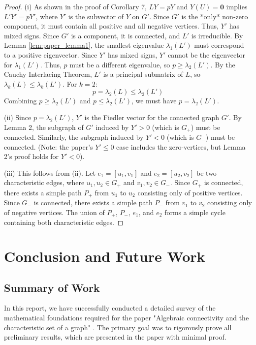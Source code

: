\documentclass[12pt,a4paper]{report}
\theoremstyle{plain}
\theoremstyle{definition}
\theoremstyle{remark}
\begin{document}
\begin{proof}
(i) As shown in the proof of Corollary 7, $LY=pY$ and $Y(U) = \bm{0}$ implies $L'Y' = pY'$, where $Y'$ is the subvector of $Y$ on $G'$. Since $G'$ is the *only* non-zero component, it must contain all positive and all negative vertices. Thus, $Y'$ has mixed signs.
Since $G'$ is a component, it is connected, and $L'$ is irreducible. By Lemma \ref{lem:paper_lemma1}, the smallest eigenvalue $\lambda_1(L')$ must correspond to a positive eigenvector.
Since $Y'$ has mixed signs, $Y'$ cannot be the eigenvector for $\lambda_1(L')$.
Thus, $p$ must be a different eigenvalue, so $p \ge \lambda_2(L')$.
By the Cauchy Interlacing Theorem, $L'$ is a principal submatrix of $L$, so $\lambda_k(L) \le \lambda_k(L')$. For $k=2$:
$$ p = \lambda_2(L) \le \lambda_2(L') $$
Combining $p \ge \lambda_2(L')$ and $p \le \lambda_2(L')$, we must have $p = \lambda_2(L')$.

(ii) Since $p = \lambda_2(L')$, $Y'$ is the Fiedler vector for the connected graph $G'$. By Lemma 2, the subgraph of $G'$ induced by $Y' > 0$ (which is $G_+$) must be connected. Similarly, the subgraph induced by $Y' < 0$ (which is $G_-$) must be connected. (Note: the paper's $Y' \le 0$ case includes the zero-vertices, but Lemma 2's proof holds for $Y' < 0$).

(iii) This follows from (ii). Let $e_1 = [u_1, v_1]$ and $e_2 = [u_2, v_2]$ be two characteristic edges, where $u_1, u_2 \in G_+$ and $v_1, v_2 \in G_-$.
Since $G_+$ is connected, there exists a simple path $P_+$ from $u_1$ to $u_2$ consisting only of positive vertices.
Since $G_-$ is connected, there exists a simple path $P_-$ from $v_1$ to $v_2$ consisting only of negative vertices.
The union of $P_+$, $P_-$, $e_1$, and $e_2$ forms a simple cycle containing both characteristic edges.
\end{proof}


\chapter{Conclusion and Future Work}

\section{Summary of Work}
In this report, we have successfully conducted a detailed survey of the mathematical foundations required for the paper "Algebraic connectivity and the characteristic set of a graph" \cite{main_paper}. The primary goal was to rigorously prove all preliminary results, which are presented in the paper with minimal proof.
\end{document}
